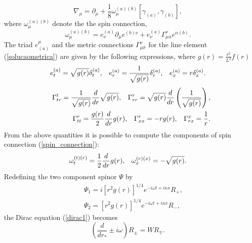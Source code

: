\documentclass[preprint]{revtex4-1}
\begin{document}
\begin{equation}\label{derivada_spinor}
\nabla_{\mu}=\partial_{\mu}+\frac{1}{8}\omega_{\mu}^{(a)(b)}\left[\gamma_{(a)},\gamma_{(b)}\right],
\end{equation}
where $\omega_{\mu}^{(a)(b)}$ denote  the the spin connection,
\begin{equation}\label{spin_connection}
\omega_{\mu}^{(a)(b)}=e_{\nu}^{(a)}\partial_{\mu}e^{(b)\nu}+e_{\nu}^{(a)}\Gamma^{\nu}_{\mu\alpha}e^{\alpha (b)}.
\end{equation}
The  triad $e_{(a)}^{\mu}$ and the metric connections $\Gamma^{\nu}_{\mu\sigma}$ for the line element (\ref{solucaometrica}) are given by the following expressions, where $g(r)=\frac{r^2}{L^2}f(r)$
\begin{equation}\label{triade}
e_{t}^{(a)}=\sqrt{g(r)}\delta_{t}^{(a)},\hspace{0.3cm} e_{r}^{(a)}=\frac{1}{\sqrt{g(r)}}\delta_{r}^{(a)}, \hspace{0.3cm}e_{x}^{(a)}=r\delta_{x}^{(a)}.
\end{equation}
\begin{eqnarray}\label{metric_connections}\nonumber
&&\Gamma^{t}_{tr}=\frac{1}{\sqrt{g(r)}}\frac{d}{dr}\sqrt{g(r)},\hspace{0.3cm}\Gamma^{r}_{rr}=\sqrt{g(r)}\frac{d}{dr}\left(\frac{1}{\sqrt{g(r)}}\right),\\
&& \Gamma^{r}_{tt}=\frac{g(r)}{2}\frac{d}{dr}g(r),\hspace{0.3cm}\Gamma^{r}_{xx}=-rg(r),\hspace{0.3cm}\Gamma^{x}_{rx}=\frac{1}{r}.
\end{eqnarray}
From the above quantities it is possible to compute the components of spin connection (\ref{spin_connection}):
\begin{equation}\label{spin_components}
\omega_{t}^{(t)(r)}=\frac{1}{2}\frac{d}{dr}g(r),\hspace{0.3cm}\omega_{x}^{(r)(x)}=-\sqrt{g(r)}.
\end{equation}
Redefining the two component spinor $\Psi$ by
\begin{eqnarray}\nonumber
&&\Psi_1=i\left[r^2g(r)\right]^{1/4}e^{-i\omega t +i\kappa x}R_{+},\\
&&\Psi_2=\left[r^2g(r)\right]^{1/4}e^{-i\omega t +i\kappa x}R_{-},
\end{eqnarray}
the Dirac equation (\ref{dirac1}) becomes
\begin{equation}\label{dirac_2}
\left(\frac{d}{dr_{*}}\pm i\omega\right)R_{\pm}=WR_{\mp}.
\end{equation}
\end{document}
